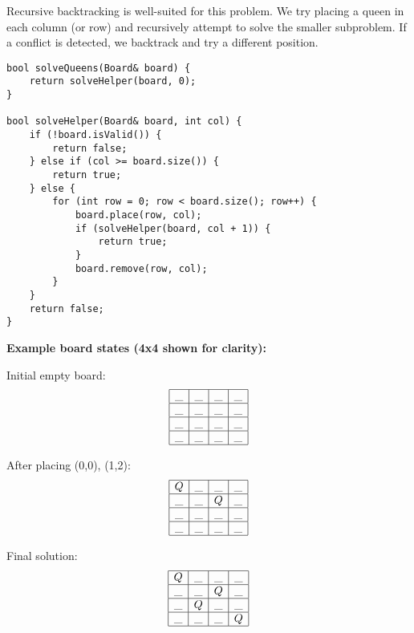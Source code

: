 \documentclass{article}
\begin{document}
Recursive backtracking is well-suited for this problem. We try placing a queen in each column (or row) and recursively attempt to solve the smaller subproblem. If a conflict is detected, we backtrack and try a different position.


\begin{lstlisting}[style=cppstyle]
bool solveQueens(Board& board) {
    return solveHelper(board, 0);
}

bool solveHelper(Board& board, int col) {
    if (!board.isValid()) {
        return false;
    } else if (col >= board.size()) {
        return true;
    } else {
        for (int row = 0; row < board.size(); row++) {
            board.place(row, col);
            if (solveHelper(board, col + 1)) {
                return true;
            }
            board.remove(row, col);
        }
    }
    return false;
}
\end{lstlisting}

\textbf{Example board states (4x4 shown for clarity):}

Initial empty board:
\[
\begin{array}{|c|c|c|c|}
\hline
\_ & \_ & \_ & \_ \\
\hline
\_ & \_ & \_ & \_ \\
\hline
\_ & \_ & \_ & \_ \\
\hline
\_ & \_ & \_ & \_ \\
\hline
\end{array}
\]

After placing (0,0), (1,2):
\[
\begin{array}{|c|c|c|c|}
\hline
Q & \_ & \_ & \_ \\
\hline
\_ & \_ & Q & \_ \\
\hline
\_ & \_ & \_ & \_ \\
\hline
\_ & \_ & \_ & \_ \\
\hline
\end{array}
\]

Final solution:
\[
\begin{array}{|c|c|c|c|}
\hline
Q & \_ & \_ & \_ \\
\hline
\_ & \_ & Q & \_ \\
\hline
\_ & Q & \_ & \_ \\
\hline
\_ & \_ & \_ & Q \\
\hline
\end{array}
\]
\end{document}
